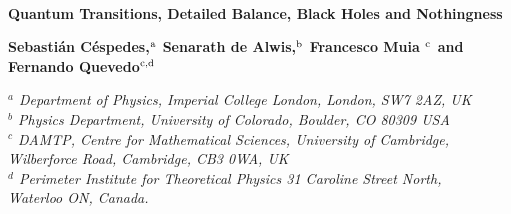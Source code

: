 \documentclass[a4paper,11pt]{article}
\title{}
\author{}
\numberwithin{equation}{section}
\numberwithin{equation}{section}
\begin{document}
%
%
\begin{titlepage}



\vspace{-0.5cm} {} \\

%
\begin{center}

\vspace{1.2truecm}

{\huge\bf{
Quantum Transitions,  Detailed Balance, Black Holes and Nothingness\\[0.3cm]}}

\vspace{1.2truecm}


{\fontsize{10.5}{18}\selectfont
{\bf Sebasti\'an C\'espedes,${}^{\rm a}$ Senarath de Alwis,${}^{\rm b}$ Francesco Muia ${}^{\rm c}$ and Fernando Quevedo${}^{\rm c, d}$
}}
\vspace{.5truecm}




{\small{\it $^{a}$ Department of Physics, Imperial College London,
London, SW7 2AZ, UK}}\\
  {\small {\it $^{b}$ Physics Department, University of Colorado, Boulder, CO 80309 USA}}\\
{\small {\it $^{c}$ DAMTP,  Centre for Mathematical Sciences,  University of Cambridge,\\ Wilberforce Road,  Cambridge, CB3 0WA, UK}}\\
{\small {\it $^{d}$ Perimeter Institute for Theoretical Physics
31 Caroline Street North,\\ Waterloo ON, Canada.}}
 
  \vskip 2.2cm
 

\end{center}
\end{titlepage}
\end{document}
